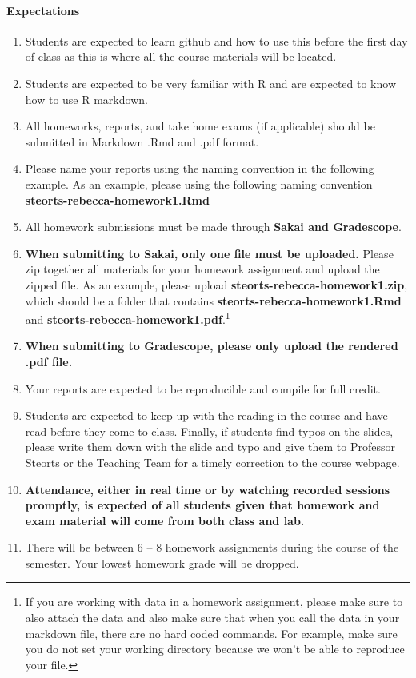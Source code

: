 \documentclass[11pt]{article}
\begin{document}


\paragraph{Expectations}
\begin{enumerate}
\item Students are expected to learn github and how to use this before the first day of class as this is where all the course materials will be located. 
\item Students are expected to be very familiar with R and are expected to know how to use R markdown. 
\item All homeworks, reports, and take home exams (if applicable) should be submitted in Markdown .Rmd and .pdf format. 
\item Please name your reports using the naming convention in the following example. As an example, please using the following naming convention \textbf{steorts-rebecca-homework1.Rmd} 
\item All homework submissions must be made through \textbf{Sakai and Gradescope}.
\item  \textbf{When submitting to Sakai, only one file must be uploaded.} Please zip together all materials for your homework assignment and upload the zipped file. As an example, please upload \textbf{steorts-rebecca-homework1.zip}, which should be a folder that contains \textbf{steorts-rebecca-homework1.Rmd}  and \textbf{steorts-rebecca-homework1.pdf}.\footnote{If you are working with data in a homework assignment, please make sure to also attach the data and also make sure that when you call the data in your markdown file, there are no hard coded commands. For example, make sure you do not set your working directory because we won't be able to reproduce your file.}
\item \textbf{When submitting to Gradescope, please only upload the rendered .pdf file.}
\item Your reports are expected to be reproducible and compile for full credit. 
\item Students are expected to keep up with the reading in the course and have read before they come to class. Finally, if students find typos on the slides, please write them down with the slide and typo and give them to Professor Steorts or the Teaching Team for a timely correction to the course webpage.  
\item \textbf{Attendance, either in real time or by watching recorded sessions promptly, is expected of all students given that homework and exam material will come from both class and lab.}
\item There will be between 6 -- 8 homework assignments during the course of the semester.  Your lowest homework grade will be dropped. 
\end{enumerate}
\end{document}
